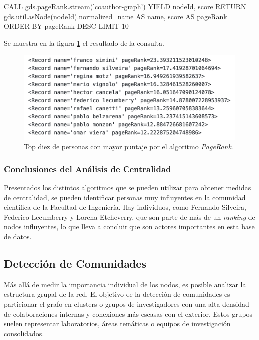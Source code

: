 \documentclass[journal]{IEEEtran}
\begin{document}
\begin{sflisting}[style=sparql,caption= PageRank,label=pagerank]
	CALL gds.pageRank.stream('coauthor-graph')
	YIELD nodeId, score
	RETURN gds.util.asNode(nodeId).normalized_name
	AS name, score AS pageRank
	ORDER BY pageRank DESC
	LIMIT 10
\end{sflisting}

Se muestra en la figura \ref{fig:page_rank} el resultado de la consulta.

\begin{figure}[htb]
	\centering
	\includegraphics[width=\linewidth]{imagenes/pagerank.png}
	\caption{Top diez de personas con mayor puntaje por el algoritmo \textit{PageRank}.}
	\label{fig:page_rank}
\end{figure}


\subsubsection{Conclusiones del Análisis de Centralidad}
Presentados los distintos algoritmos que se pueden utilizar para obtener medidas de centralidad, se pueden identificar personas muy influyentes en la comunidad científica de la Facultad de Ingeniería. Hay individuos, como Fernando Silveira, Federico Lecumberry y Lorena Etcheverry, que son parte de más de un \textit{ranking} de nodos influyentes, lo que lleva a concluir que son actores importantes en esta base de datos.

\subsection{Detección de Comunidades}
Más allá de medir la importancia individual de los nodos, es posible analizar la estructura grupal de la red. El objetivo de la detección de comunidades es particionar el grafo en clusters o grupos de investigadores con una alta densidad de colaboraciones internas y conexiones más escasas con el exterior. Estos grupos suelen representar laboratorios, áreas temáticas o equipos de investigación consolidados.
\end{document}

